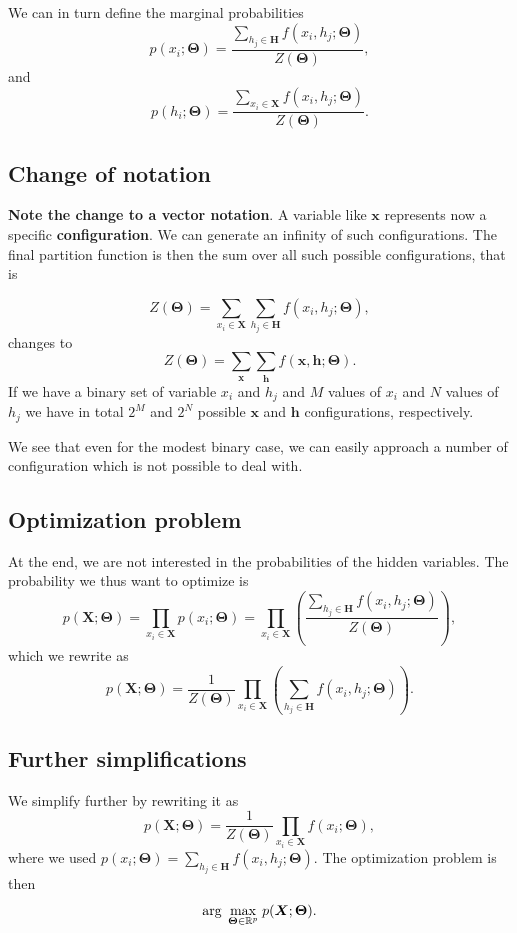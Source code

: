 \documentclass[%
oneside,                 %
final,                   %
10pt]{article}
\begin{document}
We can in turn define the marginal probabilities
\[
p(x_i;\bm{\Theta}) = \frac{\sum_{h_j\in \bm{H}}f(x_i,h_j;\bm{\Theta})}{Z(\bm{\Theta})},
\]
and 
\[
p(h_i;\bm{\Theta}) = \frac{\sum_{x_i\in \bm{X}}f(x_i,h_j;\bm{\Theta})}{Z(\bm{\Theta})}.
\]

\subsection{Change of notation}

\textbf{Note the change to a vector notation}. A variable like $\bm{x}$
represents now a specific \textbf{configuration}. We can generate an infinity
of such configurations. The final partition function is then the sum
over all such possible configurations, that is

\[
Z(\bm{\Theta})=\sum_{x_i\in \bm{X}}\sum_{h_j\in \bm{H}} f(x_i,h_j;\bm{\Theta}),
\]
changes to
\[
Z(\bm{\Theta})=\sum_{\bm{x}}\sum_{\bm{h}} f(\bm{x},\bm{h};\bm{\Theta}).
\]
If we have a binary set of variable $x_i$ and $h_j$ and $M$ values of $x_i$ and $N$ values of $h_j$ we have in total $2^M$ and $2^N$ possible $\bm{x}$ and $\bm{h}$ configurations, respectively.

We see that even for the modest binary case, we can easily approach a
number of configuration which is not possible to deal with.

\subsection{Optimization problem}

At the end, we are not interested in the probabilities of the hidden variables. The probability we thus want to optimize is 
\[
p(\bm{X};\bm{\Theta})=\prod_{x_i\in \bm{X}}p(x_i;\bm{\Theta})=\prod_{x_i\in \bm{X}}\left(\frac{\sum_{h_j\in \bm{H}}f(x_i,h_j;\bm{\Theta})}{Z(\bm{\Theta})}\right),
\]
which we rewrite as
\[
p(\bm{X};\bm{\Theta})=\frac{1}{Z(\bm{\Theta})}\prod_{x_i\in \bm{X}}\left(\sum_{h_j\in \bm{H}}f(x_i,h_j;\bm{\Theta})\right).
\]

\subsection{Further simplifications}

We simplify further by rewriting it as
\[
p(\bm{X};\bm{\Theta})=\frac{1}{Z(\bm{\Theta})}\prod_{x_i\in \bm{X}}f(x_i;\bm{\Theta}),
\]
where we used $p(x_i;\bm{\Theta}) = \sum_{h_j\in \bm{H}}f(x_i,h_j;\bm{\Theta})$.
The optimization problem is then
\[
{\displaystyle \mathrm{arg} \hspace{0.1cm}\max_{\bm{\bm{\Theta}}\in {\mathbb{R}}^{p}}} \hspace{0.1cm}p(\bm{X};\bm{\Theta}).
\]
\end{document}
